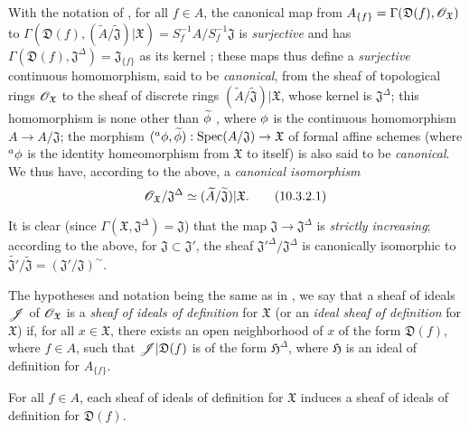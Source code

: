 \begin{env}[10.3.2]
\label{1.10.3.2}
With the notation of , for all $f\in A$, the canonical map from $A_{\{f\}}=\Gamma(\mathfrak{D}(f),\mathscr{O}_\mathfrak{X})$ to $\Gamma(\mathfrak{D}(f),(\widetilde{A}/\widetilde{\mathfrak{J}})|\mathfrak{X})=S_f^{-1}A/S_f^{-1}\mathfrak{J}$ is \emph{surjective} and has $\Gamma(\mathfrak{D}(f),\mathfrak{J}^\Delta)=\mathfrak{J}_{\{f\}}$ as its kernel ; these maps thus define a \emph{surjective} continuous homomorphism, said to be \emph{canonical}, from the sheaf of topological rings $\mathscr{O}_\mathfrak{X}$ to the sheaf of discrete rings $(\widetilde{A}/\widetilde{\mathfrak{J}})|\mathfrak{X}$, whose kernel is $\mathfrak{J}^\Delta$; this homomorphism is none other than $\widetilde{\phi}$ , where $\phi$ is the continuous homomorphism $A\to A/\mathfrak{J}$; the morphism $({}^a\vphi,\widetilde{\vphi}):\Spec(A/\mathfrak{J})\to\mathfrak{X}$ of formal affine schemes (where ${}^a\phi$ is the identity homeomorphism from $\mathfrak{X}$ to itself) is also said to be \emph{canonical}.
We thus have, according to the above, a \emph{canonical isomorphism}
\[
\label{1.10.3.2.1}
  \mathscr{O}_\mathfrak{X}/\mathfrak{J}^\Delta\simeq(\widetilde{A}/\widetilde{\mathfrak{J}})|\mathfrak{X}.
  \tag{10.3.2.1}
\]

It is clear (since $\Gamma(\mathfrak{X},\mathfrak{J}^\Delta)=\mathfrak{J}$) that the map $\mathfrak{J}\to\mathfrak{J}^\Delta$ is \emph{strictly increasing}; according to the above, for $\mathfrak{J}\subset\mathfrak{J}'$, the sheaf ${\mathfrak{J}'}^\Delta/\mathfrak{J}^\Delta$ is canonically isomorphic to $\widetilde{\mathfrak{J}'}/\widetilde{\mathfrak{J}}=(\mathfrak{J}'/\mathfrak{J})^\sim$.
\end{env}

\begin{env}[10.3.3]
\label{1.10.3.3}
The hypotheses and notation being the same as in , we say that a sheaf of ideals $\mathscr{J}$ of $\mathscr{O}_\mathfrak{X}$ is a \emph{sheaf of ideals of definition} for $\mathfrak{X}$ (or an \emph{ideal sheaf of definition} for $\mathfrak{X}$) if, for all $x\in\mathfrak{X}$, there exists an open neighborhood of $x$ of the form $\mathfrak{D}(f)$, where $f\in A$, such that $\mathscr{J}|\mathfrak{D}(f)$ is of the form $\mathfrak{H}^\Delta$, where $\mathfrak{H}$ is an ideal of definition for $A_{\{f\}}$.
\end{env}

\begin{proposition}[10.3.4]
\label{1.10.3.4}
For all $f\in A$, each sheaf of ideals of definition for $\mathfrak{X}$ induces a sheaf of ideals of definition for $\mathfrak{D}(f)$.
\end{proposition}

